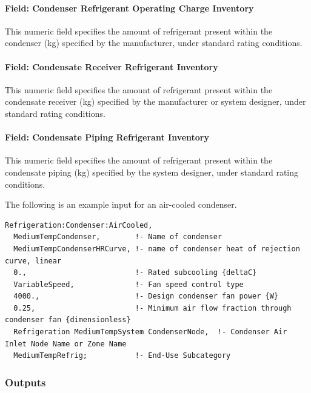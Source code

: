 \paragraph{Field: Condenser Refrigerant Operating Charge Inventory}\label{field-condenser-refrigerant-operating-charge-inventory}

This numeric field specifies the amount of refrigerant present within the condenser (kg) specified by the manufacturer, under standard rating conditions.

\paragraph{Field: Condensate Receiver Refrigerant Inventory}\label{field-condensate-receiver-refrigerant-inventory}

This numeric field specifies the amount of refrigerant present within the condensate receiver (kg) specified by the manufacturer or system designer, under standard rating conditions.

\paragraph{Field: Condensate Piping Refrigerant Inventory}\label{field-condensate-piping-refrigerant-inventory}

This numeric field specifies the amount of refrigerant present within the condensate piping (kg) specified by the system designer, under standard rating conditions.

The following is an example input for an air-cooled condenser.

\begin{lstlisting}
Refrigeration:Condenser:AirCooled,
  MediumTempCondenser,        !- Name of condenser
  MediumTempCondenserHRCurve, !- name of condenser heat of rejection curve, linear
  0.,                         !- Rated subcooling {deltaC}
  VariableSpeed,              !- Fan speed control type
  4000.,                      !- Design condenser fan power {W}
  0.25,                       !- Minimum air flow fraction through condenser fan {dimensionless}
  Refrigeration MediumTempSystem CondenserNode,  !- Condenser Air Inlet Node Name or Zone Name
  MediumTempRefrig;           !- End-Use Subcategory
\end{lstlisting}

\subsubsection{Outputs}\label{outputs-6-008}


